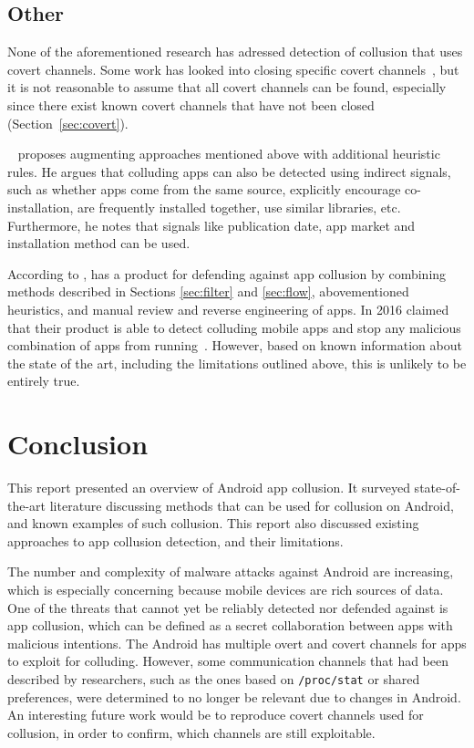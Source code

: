 \documentclass[article]{aaltoseries}
\newcommand{\Sref}[1]{Section~\ref{#1}}
\renewcommand\gls\cgls
\begin{document}
\subsection{Other}
\label{sec:othermethods}

None of the aforementioned research has adressed detection of collusion that uses covert channels. Some work has looked into closing specific covert channels~\cite{nn2017,Qi2018}, but it is not reasonable to assume that all covert channels can be found, especially since there exist known covert channels that have not been closed (\Sref{sec:covert}).

\citeauthor{Muttik2016}~\cite{Muttik2016} proposes augmenting approaches mentioned above with additional heuristic rules. He argues that colluding apps can also be detected using indirect signals, such as whether apps come from the same source, explicitly encourage co-installation, are frequently installed together, use similar libraries, etc. Furthermore, he notes that signals like publication date, app market and installation method can be used. 

According to \citeauthor{Muttik2016}, \citeauthor{McAfee2016} has a product for defending against app collusion by combining methods described in Sections \ref{sec:filter} and \ref{sec:flow}, abovementioned heuristics, and manual review and reverse engineering of apps. In 2016 \citeauthor{McAfee2016} claimed that their product is able to detect colluding mobile apps and stop any malicious combination of apps from running~\cite{McAfee2016}. However, based on known information about the state of the art, including the limitations outlined above, this is unlikely to be entirely true.

\section{Conclusion}
\label{sec:conclusion}

This report presented an overview of Android app collusion. It surveyed state-of-the-art literature discussing methods that can be used for collusion on Android, and known examples of such collusion. This report also discussed existing approaches to app collusion detection, and their limitations.

The number and complexity of malware attacks against Android are increasing, which is especially concerning because mobile devices are rich sources of data. One of the threats that cannot yet be reliably detected nor defended against is app collusion, which can be defined as a secret collaboration between apps with malicious intentions. The Android \gls{os} has multiple overt and covert channels for apps to exploit for colluding. However, some communication channels that had been described by researchers, such as the ones based on \texttt{/proc/stat} or shared preferences, were determined to no longer be relevant due to changes in Android. An interesting future work would be to reproduce covert channels used for collusion, in order to confirm, which channels are still exploitable.
\end{document}
